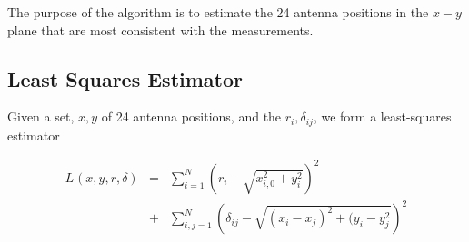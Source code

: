\documentclass[a4paper,10pt]{article}
\begin{document}
The purpose of the algorithm is to estimate the 24 antenna positions in the $x-y$ plane that are most consistent with the measurements.

\subsection{Least Squares Estimator}

Given a set, $x,y$ of 24 antenna positions, and the $r_i, \delta_{ij}$, we form a least-squares estimator

\begin{eqnarray}
 L_{}(x, y, r, \delta) & = & \sum_{i=1}^{N} \left( r_i - \sqrt{x_{i,0}^2 + y_i^2}  \right)^2 \nonumber \\
 & + & \sum_{i,j=1}^{N} \left( \delta_{ij} - \sqrt{(x_i - x_j)^2 + (y_i - y_j^2}  \right)^2
\end{eqnarray}
\end{document}

